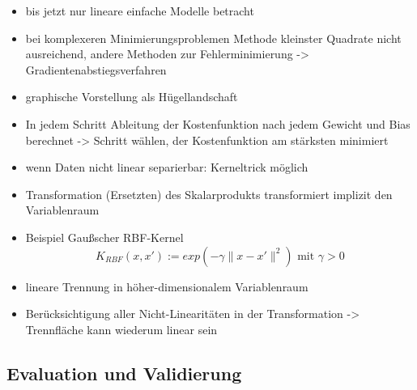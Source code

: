\begin{itemize}
		\item bis jetzt nur lineare einfache Modelle betracht
		\item bei komplexeren Minimierungsproblemen Methode kleinster Quadrate nicht ausreichend, andere Methoden zur Fehlerminimierung -> Gradientenabstiegsverfahren
		\item graphische Vorstellung als Hügellandschaft
		\item In jedem Schritt Ableitung der Kostenfunktion nach jedem Gewicht und Bias berechnet -> Schritt wählen, der Kostenfunktion am stärksten minimiert
		\item wenn Daten nicht linear separierbar: Kerneltrick möglich
		\item Transformation (Ersetzten) des Skalarprodukts transformiert implizit den Variablenraum
		\item Beispiel Gaußscher RBF-Kernel \[K_{RBF} (x, x\prime) := exp(-\gamma \|x - x\prime\|^2) \text{ mit } \gamma > 0\]
		\item lineare Trennung in höher-dimensionalem Variablenraum
		\item Berücksichtigung aller Nicht-Linearitäten in der Transformation -> Trennfläche kann wiederum linear sein
	\end{itemize} 
	
	\subsection{Evaluation und Validierung}
	
